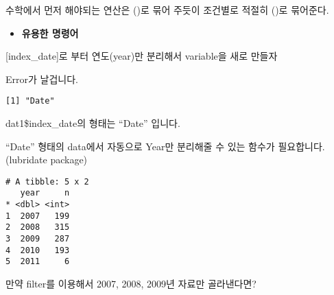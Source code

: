 \documentclass[
]{article}
\newenvironment{Shaded}{\begin{snugshade}}{\end{snugshade}}
\newcommand{\CommentTok}[1]{\textcolor[rgb]{0.56,0.35,0.01}{\textit{#1}}}
\newcommand{\FunctionTok}[1]{\textcolor[rgb]{0.00,0.00,0.00}{#1}}
\newcommand{\NormalTok}[1]{#1}
\newcommand{\OtherTok}[1]{\textcolor[rgb]{0.56,0.35,0.01}{#1}}
\newcommand{\SpecialCharTok}[1]{\textcolor[rgb]{0.00,0.00,0.00}{#1}}
\providecommand{\tightlist}{%
  \setlength{\itemsep}{0pt}\setlength{\parskip}{0pt}}
\begin{document}
수학에서 먼저 해야되는 연산은 ()로 묶어 주듯이 조건별로 적절히 ()로
묶어준다.

\begin{itemize}
\tightlist
\item
  \textbf{유용한 명령어}
\end{itemize}

{[}index\_date{]}로 부터 연도(year)만 분리해서 variable을 새로 만들자

\begin{Shaded}
\end{Shaded}

Error가 날겁니다.

\begin{Shaded}
\end{Shaded}

\begin{verbatim}
[1] "Date"
\end{verbatim}

dat1\$index\_date의 형태는 ``Date'' 입니다.

``Date'' 형태의 data에서 자동으로 Year만 분리해줄 수 있는 함수가
필요합니다. (lubridate package)

\begin{Shaded}
\end{Shaded}

\begin{verbatim}
# A tibble: 5 x 2
   year     n
* <dbl> <int>
1  2007   199
2  2008   315
3  2009   287
4  2010   193
5  2011     6
\end{verbatim}

만약 filter를 이용해서 2007, 2008, 2009년 자료만 골라낸다면?
\end{document}
